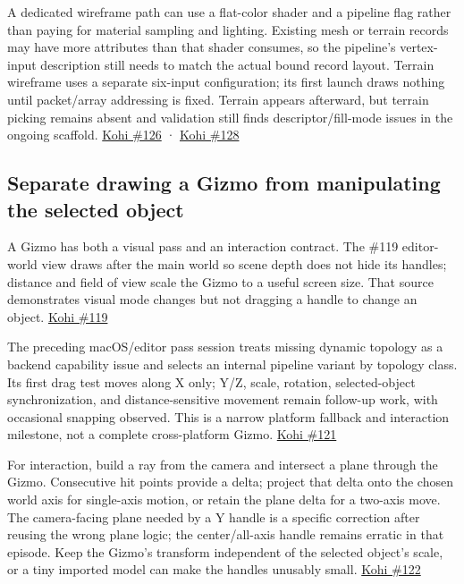 A dedicated wireframe path can use a flat-color shader and a pipeline flag rather than paying for material sampling and lighting. Existing mesh or terrain records may have more attributes than that shader consumes, so the pipeline's vertex-input description still needs to match the actual bound record layout. Terrain wireframe uses a separate six-input configuration; its first launch draws nothing until packet/array addressing is fixed. Terrain appears afterward, but terrain picking remains absent and validation still finds descriptor/fill-mode issues in the ongoing scaffold. \href{https://www.youtube.com/watch?v=xCA1MY94Hh0}{Kohi \#126} · \href{https://www.youtube.com/watch?v=ZTC7Lryt6uQ}{Kohi \#128}

\subsection{Separate drawing a Gizmo from manipulating the selected object}\label{06-engine-ii-ch032-separate-drawing-a-gizmo-from-manipulating-the-selected-object}

\hypertarget{06-engine-ii-ch032-separate-drawing-a-gizmo-from-manipulating-the-selected-object}{}

A Gizmo has both a visual pass and an interaction contract. The \#119 editor-world view draws after the main world so scene depth does not hide its handles; distance and field of view scale the Gizmo to a useful screen size. That source demonstrates visual mode changes but not dragging a handle to change an object. \href{https://www.youtube.com/watch?v=pPWshwZB7eo}{Kohi \#119}

The preceding macOS/editor pass session treats missing dynamic topology as a backend capability issue and selects an internal pipeline variant by topology class. Its first drag test moves along X only; Y/Z, scale, rotation, selected-object synchronization, and distance-sensitive movement remain follow-up work, with occasional snapping observed. This is a narrow platform fallback and interaction milestone, not a complete cross-platform Gizmo. \href{https://www.youtube.com/watch?v=dU6XqDBJJO4}{Kohi \#121}

For interaction, build a ray from the camera and intersect a plane through the Gizmo. Consecutive hit points provide a delta; project that delta onto the chosen world axis for single-axis motion, or retain the plane delta for a two-axis move. The camera-facing plane needed by a Y handle is a specific correction after reusing the wrong plane logic; the center/all-axis handle remains erratic in that episode. Keep the Gizmo's transform independent of the selected object's scale, or a tiny imported model can make the handles unusably small. \href{https://www.youtube.com/watch?v=MWraFUbYBN4}{Kohi \#122}

